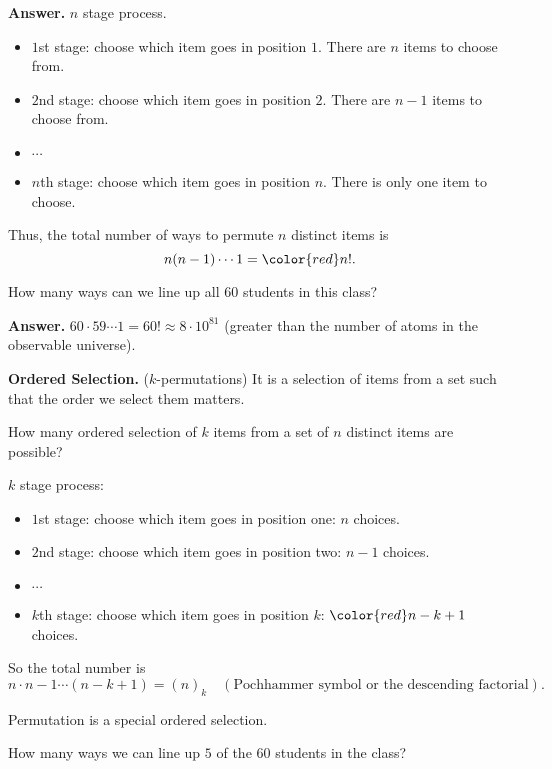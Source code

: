  \textbf{Answer.} $n$ stage process. 
  \begin{itemize}
  \item $1$st stage: choose which item goes in position $1$. There are $n$ items
    to choose from.
  \item $2$nd stage: choose which item goes in position $2$. There are $n-1$
    items to choose from.
  \item $\cdots$
  \item $n$th stage: choose which item goes in position $n$. There
    is only one item to choose.
  \end{itemize}
  Thus, the total number of ways to permute $n$ distinct items is
  \[
    n(n-1)\cdots 1 = {\color{red} n!}.
  \]

  \begin{example}
    How many ways can we line up all $60$ students in this class?
  \end{example}
  \textbf{Answer.} $60\cdot 59\cdots 1 = 60! \approx 8\cdot 10^{81}$ (greater
  than the number of atoms in the observable universe).

  \textbf{Ordered Selection.} ($k$-permutations) It is a selection of items from
  a set such that the order we select them matters.

  How many ordered selection of $k$ items from a set of $n$ distinct items are
  possible?

  $k$ stage process:
  \begin{itemize}
  \item $1$st stage: choose which item goes in position one: $n$ choices.
  \item $2$nd stage: choose which item goes in position two: $n-1$ choices.
  \item $\cdots$
  \item $k$th stage: choose which item goes in position $k$: ${\color{red}
      n-k+1} $ choices.
  \end{itemize}

  So the total number is
  \[
    n\cdot n-1\cdots (n-k+1) = (n)_k \quad(\text{Pochhammer symbol or the
      descending factorial}).
  \]

  \begin{remark}
   Permutation is a special ordered selection. 
  \end{remark}

  \begin{example}
    How many ways we can line up $5$ of the $60$ students in the class?
  \end{example}

